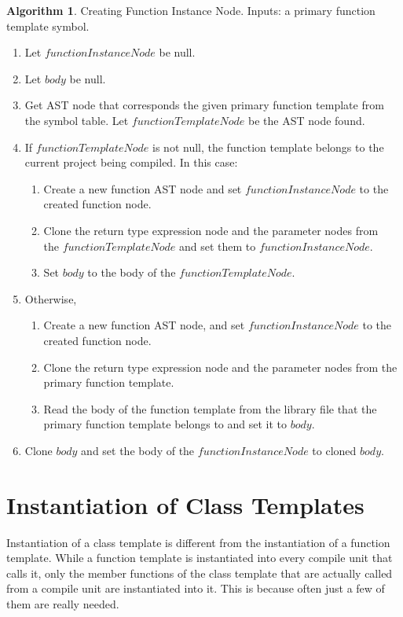 \documentclass[a4paper,oneside,11pt]{book}
\theoremstyle{definition}
\newtheorem{algo}{Algorithm}[section]
\begin{document}
\begin{algo}\label{createfunctioninstance} Creating Function Instance Node. Inputs: a primary function template symbol.
\begin{enumerate}
\item
Let $functionInstanceNode$ be null.
\item
Let $body$ be null.
\item
Get AST node that corresponds the given primary function template from the symbol table. Let $functionTemplateNode$ be the AST node found.
\item
If $functionTemplateNode$ is not null, the function template belongs to the current project being compiled. In this case:
\begin{enumerate}
\item
Create a new function AST node and set $functionInstanceNode$ to the created function node.
\item
Clone the return type expression node and the parameter nodes from\\
the $functionTemplateNode$ and set them to $functionInstanceNode$.
\item
Set $body$ to the body of the $functionTemplateNode$.
\end{enumerate}
\item
Otherwise,
\begin{enumerate}
\item
Create a new function AST node, and set $functionInstanceNode$ to the created function node.
\item
Clone the return type expression node and the parameter nodes from the primary function template.
\item
Read the body of the function template from the library file that the primary function template belongs to and set it to $body$.
\end{enumerate}
\item
Clone $body$ and set the body of the $functionInstanceNode$ to cloned $body$.
\end{enumerate}
\end{algo}

\section{Instantiation of Class Templates}

Instantiation of a class template is different from the instantiation of a function template.
While a function template is instantiated into every compile unit that calls it, only the member functions of the class template that are
actually called from a compile unit are instantiated into it. This is because often just a few of them are really needed.
\end{document}
